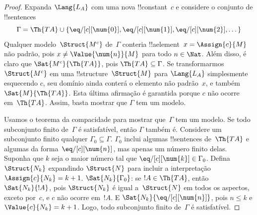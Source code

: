 \documentclass[../../../include/open-logic-section]{subfiles}
\begin{document}
\begin{proof}
Expanda $\Lang{L_A}$ com uma nova !!{constant}~$c$ e considere o
conjunto de !!{sentence}s
\[
\Gamma = \Th{TA} \cup \{\eq/[c][\num{0}], \eq/[c][\num{1}],
\eq/[c][\num{2}], \dots\}
\]
Qualquer modelo~$\Struct{M^c}$ de~$\Gamma$ conteria !!a{element}~$x =
\Assign{c}{M}$ não padrão, pois $x \neq \Value{\num{n}}{M}$ para todo
$n \in \Nat$. Além disso, é claro que $\Sat{M^c}{\Th{TA}}$, pois
$\Th{TA} \subseteq \Gamma$. Se transformarmos $\Struct{M^c}$ em uma
!!{structure}~$\Struct{M}$ para $\Lang{L_A}$ simplesmente esquecendo
$c$, seu domínio ainda conterá o elemento não padrão~$x$, e também
$\Sat{M}{\Th{TA}}$. Esta última afirmação é garantida porque $c$ não
ocorre em~$\Th{TA}$. Assim, basta mostrar que $\Gamma$ tem um modelo.

Usamos o teorema da compacidade para mostrar que~$\Gamma$ tem um
modelo. Se todo subconjunto finito de~$\Gamma$ é satisfatível, então
$\Gamma$ também é. Considere um subconjunto finito qualquer
$\Gamma_0 \subseteq \Gamma$. $\Gamma_0$ inclui algumas !!{sentence}s
de~$\Th{TA}$ e algumas da forma~$\eq/[c][\num{n}]$, mas apenas um
número finito delas. Suponha que $k$ seja o maior número tal que
$\eq/[c][\num{k}] \in \Gamma_0$. Defina $\Struct{N_k}$ expandindo
$\Struct{N}$ para incluir a interpretação~$\Assign{c}{N_k} = k+1$.
$\Sat{N_k}{\Gamma_0}$: se $!A \in \Th{TA}$, então $\Sat{N_k}{!A}$,
pois $\Struct{N_k}$ é igual a~$\Struct{N}$ em todos os aspectos,
exceto por~$c$, e $c$ não ocorre em~$!A$. E
$\Sat{N_k}{\eq/[c][\num{n}]}$, pois $n \le k$ e $\Value{c}{N_k} =
k+1$. Logo, todo subconjunto finito de~$\Gamma$ é satisfatível.
\end{proof}
\end{document}
